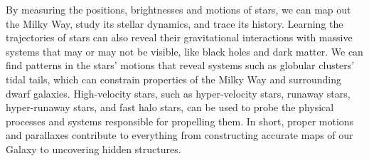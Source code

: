 \documentclass[usenatbib]{mnras}   %
\begin{document}
By measuring the positions, brightnesses and motions of stars, we can map out the Milky Way, study its stellar dynamics, and trace its history. Learning the trajectories of stars can also reveal their gravitational interactions with massive systems that may or may not be visible, like black holes and dark matter. We can find patterns in the stars' motions that reveal systems such as globular clusters' tidal tails, which can constrain properties of the Milky Way and surrounding dwarf galaxies.   High-velocity stars, such as hyper-velocity stars, runaway stars, hyper-runaway stars, and fast halo stars, can be used to probe the physical processes and systems responsible for propelling them. In short, proper motions and parallaxes contribute to everything from constructing accurate maps of our Galaxy to uncovering hidden structures.
\end{document}
